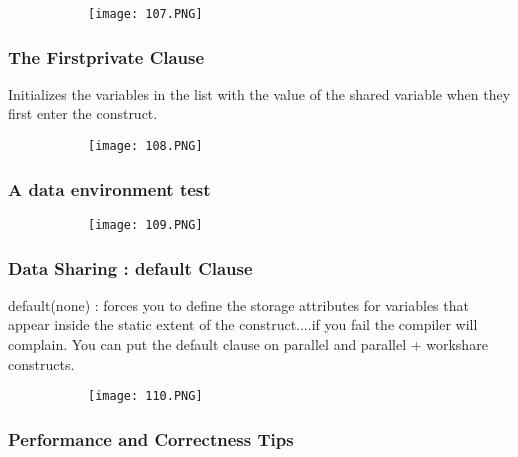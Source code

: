 \documentclass{article}
\begin{document}
\begin{figure}[ht!]
  \centering
  \begin{subfigure}[b]{0.5\linewidth}
    \texttt{[image: 107.PNG]}
  \end{subfigure}
\end{figure}

\subsubsection{The Firstprivate Clause}

Initializes the variables in the list with the value of the shared variable when they first enter the construct.

\begin{figure}[ht!]
  \centering
  \begin{subfigure}[b]{0.4\linewidth}
    \texttt{[image: 108.PNG]}
  \end{subfigure}
\end{figure}

\subsubsection{A data environment test}

\begin{figure}[ht!]
  \centering
  \begin{subfigure}[b]{0.5\linewidth}
    \texttt{[image: 109.PNG]}
  \end{subfigure}
\end{figure}

\subsubsection{Data Sharing : default Clause}

default(none) : forces you to define the storage attributes for variables that appear inside the static extent of the construct....if you fail the compiler will complain.
You can put the default clause on parallel and parallel + workshare constructs.

\begin{figure}[ht!]
  \centering
  \begin{subfigure}[b]{0.5\linewidth}
    \texttt{[image: 110.PNG]}
  \end{subfigure}
\end{figure}

\subsubsection{Performance and Correctness Tips}
\end{document}
